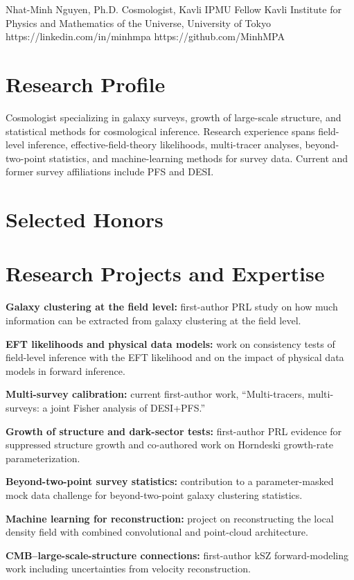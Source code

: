 



\cvheader
  {Nhat-Minh Nguyen, Ph.D.}
  {Cosmologist, Kavli IPMU Fellow}
  {Kavli Institute for Physics and Mathematics of the Universe, University of Tokyo}
  {https://linkedin.com/in/minhmpa}
  {https://github.com/MinhMPA}

\section*{Research Profile}
Cosmologist specializing in galaxy surveys, growth of large-scale structure, and statistical methods for cosmological inference. Research experience spans field-level inference, effective-field-theory likelihoods, multi-tracer analyses, beyond-two-point statistics, and machine-learning methods for survey data. Current and former survey affiliations include PFS and DESI.

\section*{Selected Honors}

\section*{Research Projects and Expertise}
\begin{tightitemize}
  \item \textbf{Galaxy clustering at the field level:} first-author PRL study on how much information can be extracted from galaxy clustering at the field level.
  \item \textbf{EFT likelihoods and physical data models:} work on consistency tests of field-level inference with the EFT likelihood and on the impact of physical data models in forward inference.
  \item \textbf{Multi-survey calibration:} current first-author work, ``Multi-tracers, multi-surveys: a joint Fisher analysis of DESI+PFS.''
  \item \textbf{Growth of structure and dark-sector tests:} first-author PRL evidence for suppressed structure growth and co-authored work on Horndeski growth-rate parameterization.
  \item \textbf{Beyond-two-point survey statistics:} contribution to a parameter-masked mock data challenge for beyond-two-point galaxy clustering statistics.
  \item \textbf{Machine learning for reconstruction:} project on reconstructing the local density field with combined convolutional and point-cloud architecture.
  \item \textbf{CMB--large-scale-structure connections:} first-author kSZ forward-modeling work including uncertainties from velocity reconstruction.
\end{tightitemize}

